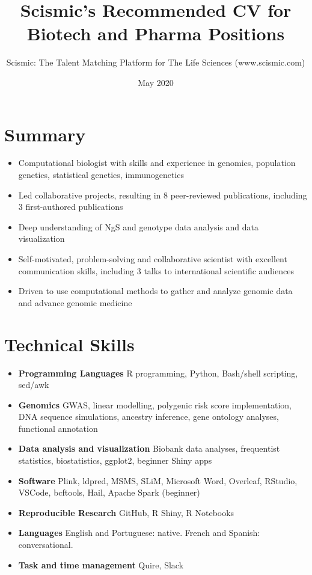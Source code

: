 \documentclass{article}
\title{Scismic's Recommended CV for Biotech and Pharma Positions}
\author{Scismic: The Talent Matching Platform for The Life Sciences (www.scismic.com)}
\date{May 2020}
\begin{document}
\makecvtitle %
\section{Summary}
\begin{itemize}
\item Computational biologist with skills and experience in genomics, population genetics, statistical genetics, immunogenetics
\item Led collaborative projects, resulting in 8 peer-reviewed publications, including 3 first-authored publications
\item Deep understanding of NgS and genotype data analysis and data visualization 
\item Self-motivated, problem-solving and collaborative scientist with excellent communication skills, including 3 talks to international scientific audiences
\item Driven to use computational methods to gather and analyze genomic data and advance genomic medicine
\end{itemize}
 
\section{Technical Skills}

\begin{itemize}
\item \textbf{Programming Languages} R programming, Python, Bash/shell scripting, sed/awk
\item \textbf{Genomics} GWAS, linear modelling, polygenic risk score implementation, DNA sequence simulations, ancestry inference, gene ontology analyses, functional annotation
\item \textbf{Data analysis and visualization} Biobank data analyses, frequentist statistics, biostatistics, ggplot2, beginner Shiny apps
\item \textbf{Software} Plink, ldpred, MSMS, SLiM, Microsoft Word, Overleaf, RStudio, VSCode, bcftools, Hail, Apache Spark (beginner)
\item \textbf{Reproducible Research} GitHub, R Shiny, R Notebooks
\item \textbf{Languages}	English and Portuguese: native. French and Spanish: conversational.
\item \textbf{Task and time management} Quire, Slack
\end{itemize}
 
\end{document}
